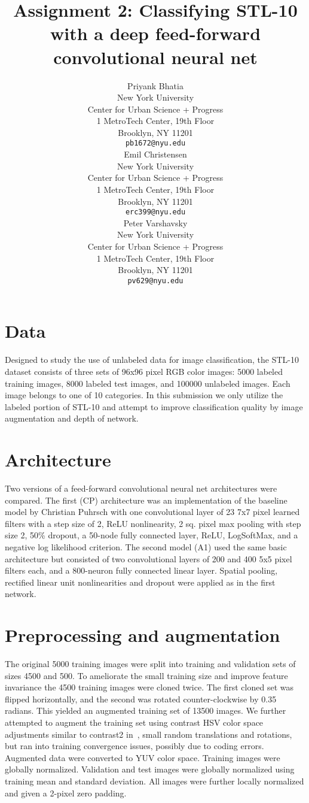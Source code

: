 \documentclass{article} %
\title{Assignment 2: Classifying STL-10 with a deep feed-forward convolutional neural net}
\author{
Priyank Bhatia \\
New York University \\
Center for Urban Science + Progress \\
1 MetroTech Center, 19th Floor \\
Brooklyn, NY 11201 \\
\texttt{pb1672@nyu.edu} \\
\AND
Emil Christensen \\
New York University \\
Center for Urban Science + Progress \\
1 MetroTech Center, 19th Floor \\
Brooklyn, NY 11201 \\
\texttt{erc399@nyu.edu} \\
\And
Peter Varshavsky \\
New York University \\
Center for Urban Science + Progress \\
1 MetroTech Center, 19th Floor \\
Brooklyn, NY 11201 \\
\texttt{pv629@nyu.edu} \\
}
\begin{document}
\maketitle



\section{Data}
\label{data}
Designed to study the use of unlabeled data for image classification, the STL-10 dataset \cite{coates2011analysis} consists of three sets of 96x96 pixel RGB color images: 5000 labeled training images, 8000 labeled test images, and 100000 unlabeled images. Each image belongs to one of 10 categories. In this submission we only utilize the labeled portion of STL-10 and attempt to improve classification quality by image augmentation and depth of network.

\section{Architecture}
\label{arc}
Two versions of a feed-forward convolutional neural net architectures were compared. The first (CP) architecture was an implementation of the baseline model by Christian Puhrsch with one convolutional layer of 23 7x7 pixel learned filters with a step size of 2, ReLU nonlinearity, 2 sq. pixel max pooling with step size 2, 50\% dropout, a 50-node fully connected layer, ReLU, LogSoftMax, and a negative log likelihood criterion.
The second model (A1) used the same basic architecture but consisted of two convolutional layers of 200 and 400 5x5 pixel filters each, and a 800-neuron fully connected linear layer. Spatial pooling, rectified linear unit nonlinearities and dropout were applied as in the first network.

\section{Preprocessing and augmentation}
\label{preproc}
The original 5000 training images were split into training and validation sets of sizes 4500 and 500. To ameliorate the small training size and improve feature invariance the 4500 training images were cloned twice. The first cloned set was flipped horizontally, and the second was rotated counter-clockwise by 0.35 radians. This yielded an augmented training set of 13500 images. We further attempted to augment the training set using contrast HSV color space adjustments similar to contrast2 in~\cite{DosovitskiySRB14}, small random translations and rotations, but ran into training convergence issues, possibly due to coding errors. Augmented data were converted to YUV color space. Training images were globally normalized. Validation and test images were globally normalized using training mean and standard deviation. All images were further locally normalized and given a 2-pixel zero padding.
\end{document}

